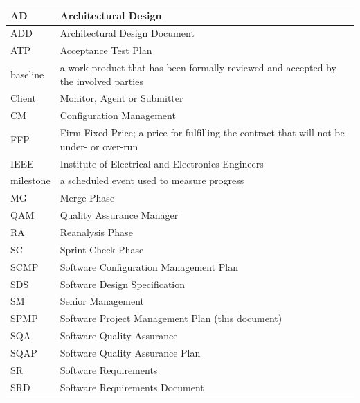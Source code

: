 \documentclass[11pt,a4paper]{article}
\begin{document}
\begin{center}
\begin{longtable}{|p{3cm}|p{9.1cm}|}
            \hline
            \endlastfoot
            AD          & Architectural Design  \\
            \hline
            ADD         & Architectural Design Document  \\
            \hline
            ATP         & Acceptance Test Plan  \\
            \hline
            baseline    & a work product that has been formally reviewed and accepted by the involved parties  \\
            \hline
            Client      & Monitor, Agent or Submitter  \\
            \hline
            CM          & Configuration Management  \\
            \hline
            FFP         & Firm-Fixed-Price; a price for fulfilling the contract that will not be under- or over-run \\
            \hline
            IEEE        & Institute of Electrical and Electronics Engineers  \\
            \hline
            milestone   & a scheduled event used to measure progress  \\
            \hline
            MG          & Merge Phase \\
            \hline
            QAM         & Quality Assurance Manager  \\
            \hline
            RA          & Reanalysis Phase \\
            \hline
            SC          & Sprint Check Phase \\
            \hline
            SCMP        & Software Configuration Management Plan  \\
            \hline
            SDS         & Software Design Specification  \\
            \hline
            SM          & Senior Management  \\
            \hline
            SPMP        & Software Project Management Plan (this document)  \\
            \hline
            SQA         & Software Quality Assurance  \\
            \hline
            SQAP        & Software Quality Assurance Plan  \\
            \hline
            SR          & Software Requirements  \\
            \hline
            SRD         & Software Requirements Document  \\

\end{longtable}
\end{center}
\end{document}

